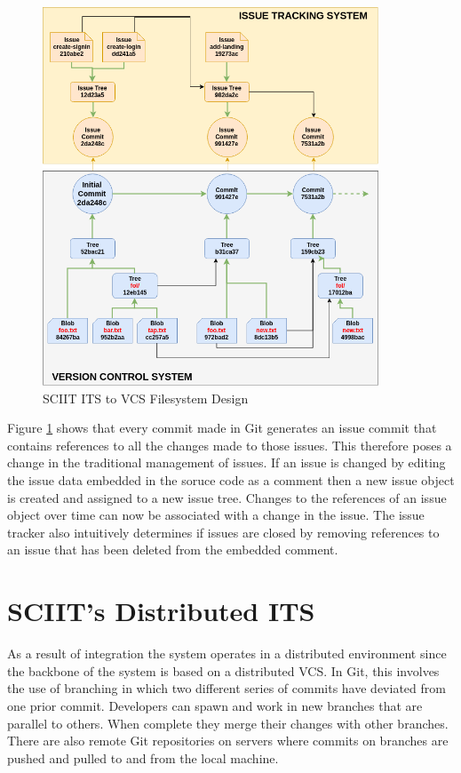 \documentclass{mproj}
\begin{document}
\begin{figure}[t]
\caption{SCIIT ITS to VCS Filesystem Design}
\label{fig:sciit-filesystem}
\centering
\includegraphics[width=10cm]{sciit-filesystem}
\end{figure}

Figure \ref{fig:sciit-filesystem} shows that every commit made in Git generates an issue commit that contains references to all the changes made to those issues. This therefore poses a change in the traditional management of issues. If an issue is changed by editing the issue data embedded in the soruce code as a comment then a new issue object is created and assigned to a new issue tree. Changes to the references of an issue object over time can now be associated with a change in the issue. The issue tracker also intuitively determines if issues are closed by removing references to an issue that has been deleted from the embedded comment.









\section{SCIIT's Distributed ITS}

As a result of integration the system operates in a distributed environment since the backbone of the system is based on a distributed VCS. In Git, this involves the use of branching in which two different series of commits have deviated from one prior commit. Developers can spawn and work in new branches that are parallel to others. When complete they merge their changes with other branches. There are also remote Git repositories on servers where commits on branches are pushed and pulled to and from the local machine. 
\end{document}
